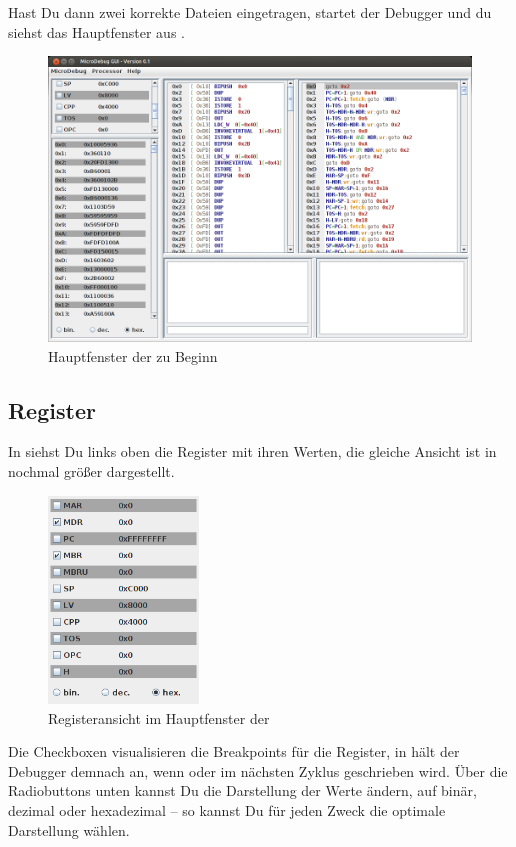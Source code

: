 Hast Du dann zwei korrekte Dateien eingetragen, startet der Debugger und du siehst das Hauptfenster aus .

\begin{figure}[h]
	\centering
	\includegraphics[width=0.8\linewidth]{images/main-frame-onbegin}
	\caption{Hauptfenster der \mdg{} zu Beginn}
\end{figure}

\subsection{Register}
In  siehst Du links oben die Register mit ihren Werten, die gleiche Ansicht ist in  nochmal größer dargestellt.

\begin{figure}[h]
	\centering
	\includegraphics[width=4cm]{images/main-frame-registers}
	\caption{Registeransicht im Hauptfenster der \mdg{}}
\end{figure}

Die Checkboxen visualisieren die Breakpoints für die Register, in  hält der Debugger demnach an, wenn  oder  im nächsten Zyklus geschrieben wird. Über die Radiobuttons unten kannst Du die Darstellung der Werte ändern, auf binär, dezimal oder hexadezimal -- so kannst Du für jeden Zweck die optimale Darstellung wählen.

